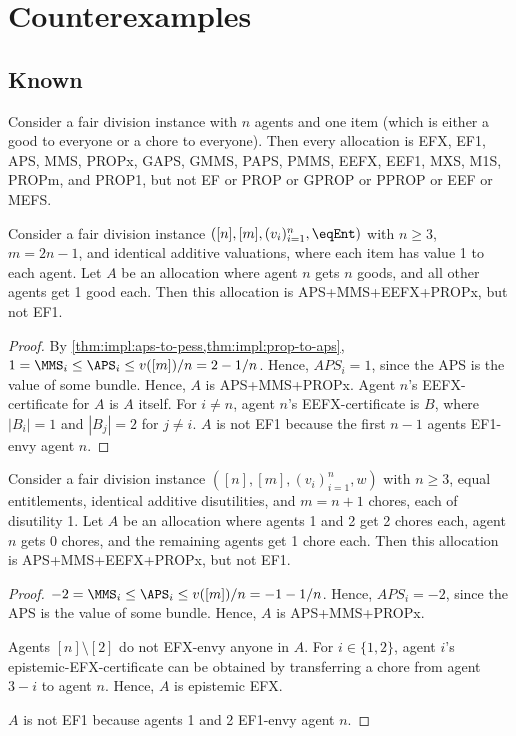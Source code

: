 \section{Counterexamples}
\label{sec:counterexamples}

\subsection{Known}

\begin{example}
\label{cex:single-item}
Consider a fair division instance with $n$ agents and one item
(which is either a good to everyone or a chore to everyone).
Then every allocation is EFX, EF1, APS, MMS, PROPx, GAPS, GMMS, PAPS, PMMS,
EEFX, EEF1, MXS, M1S, PROPm, and PROP1,
but not EF or PROP or GPROP or PPROP or EEF or MEFS.
\end{example}

\begin{lemma}
\label{cex:share-vs-envy-goods}
Consider a fair division instance $([n], [m], (v_i)_{i=1}^n, \eqEnt)$
with $n \ge 3$, $m = 2n-1$, and identical additive valuations,
where each item has value 1 to each agent.
Let $A$ be an allocation where agent $n$ gets $n$ goods,
and all other agents get 1 good each.
Then this allocation is APS+MMS+EEFX+PROPx, but not EF1.
\end{lemma}
\begin{proof}
By \cref{thm:impl:aps-to-pess,thm:impl:prop-to-aps},
$1 = \MMS_i \le \APS_i \le v([m])/n = 2 - 1/n$.
Hence, $APS_i = 1$, since the APS is the value of some bundle.
Hence, $A$ is APS+MMS+PROPx.
Agent $n$'s EEFX-certificate for $A$ is $A$ itself.
For $i \neq n$, agent $n$'s EEFX-certificate is $B$,
where $|B_i| = 1$ and $|B_j| = 2$ for $j \neq i$.
%
$A$ is not EF1 because the first $n-1$ agents EF1-envy agent $n$.
\end{proof}

\begin{lemma}
\label{cex:share-vs-envy-chores}
Consider a fair division instance $([n], [m], (v_i)_{i=1}^n, w)$
with $n \ge 3$, equal entitlements, identical additive disutilities,
and $m = n+1$ chores, each of disutility 1.
Let $A$ be an allocation where agents 1 and 2 get 2 chores each,
agent $n$ gets 0 chores, and the remaining agents get 1 chore each.
Then this allocation is APS+MMS+EEFX+PROPx, but not EF1.
\end{lemma}
\begin{proof}
$-2 = \MMS_i \le \APS_i \le v([m])/n = - 1 - 1/n$.
Hence, $APS_i = -2$, since the APS is the value of some bundle.
Hence, $A$ is APS+MMS+PROPx.

Agents $[n] \setminus [2]$ do not EFX-envy anyone in $A$.
For $i \in \{1, 2\}$, agent $i$'s epistemic-EFX-certificate can be obtained by
transferring a chore from agent $3-i$ to agent $n$.
Hence, $A$ is epistemic EFX.

$A$ is not EF1 because agents 1 and 2 EF1-envy agent $n$.
\end{proof}

